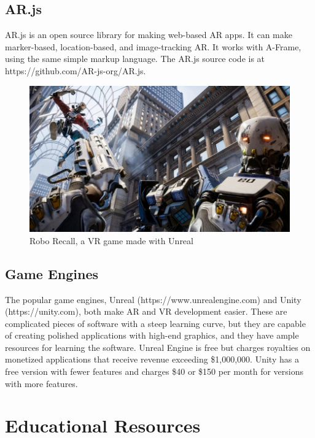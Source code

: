 \documentclass{article}
\begin{document}
\subsection{AR.js}
AR.js is an open source library for making web-based AR apps. It can make marker-based, location-based, and image-tracking AR. It works with A-Frame, using the same simple markup language. The AR.js source code is at https://github.com/AR-js-org/AR.js.

\begin{figure}
\centering
\includegraphics[width=.45\textwidth]{robo}
\caption{Robo Recall, a VR game made with Unreal}
\end{figure}

\subsection{Game Engines}
The popular game engines, Unreal (https://www.unrealengine.com) and Unity (https://unity.com), both make AR and VR development easier. These are complicated pieces of software with a steep learning curve, but they are capable of creating polished applications with high-end graphics, and they have ample resources for learning the software. Unreal Engine is free but charges royalties on monetized applications that receive revenue exceeding \$1,000,000. Unity has a free version with fewer features and charges \$40 or \$150 per month for versions with more features.

\section{Educational Resources}
\end{document}
